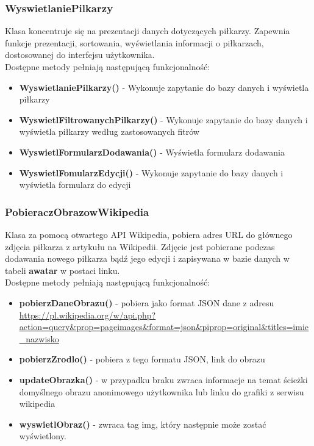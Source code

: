     \subsubsection{WyswietlaniePilkarzy}
        Klasa koncentruje się na prezentacji danych dotyczących piłkarzy. Zapewnia funkcje prezentacji, sortowania, wyświetlania informacji o piłkarzach, dostosowanej do interfejsu użytkownika.\\
        Dostępne metody pełniają następującą funkcjonalność: 
        \begin{itemize}
            \item \textbf{WyswietlaniePilkarzy()} -  Wykonuje zapytanie do bazy danych i wyświetla piłkarzy
            \item \textbf{WyswietlFiltrowanychPilkarzy()} - Wykonuje zapytanie do bazy danych i wyświetla piłkarzy według zastosowanych fitrów
            \item \textbf{WyswietlFormularzDodawania()} - Wyświetla formularz dodawania 
            \item \textbf{WyswietlFomularzEdycji()} - Wykonuje zapytanie do bazy danych i wyświetla formularz do edycji
        \end{itemize}
         



    \subsubsection{PobieraczObrazowWikipedia}
        Klasa za pomocą otwartego API Wikipedia, pobiera adres URL do głównego zdjęcia piłkarza z artykułu na Wikipedii. Zdjęcie jest pobierane podczas dodawania nowego piłkarza bądź jego edycji i zapisywana w bazie danych w tabeli \textbf{awatar} w postaci linku.\\
        Dostępne metody pełniają następującą funkcjonalność: 
        \begin{itemize}
            \item \textbf{pobierzDaneObrazu()} -  pobiera jako format JSON dane z adresu \url{https://pl.wikipedia.org/w/api.php?action=query&prop=pageimages&format=json&piprop=original&titles=imie_nazwisko}
            \item \textbf{pobierzZrodlo()} - pobiera z tego formatu JSON, link do obrazu
            \item \textbf{updateObrazka()} - w przypadku braku zwraca informacje na temat ścieżki domyślnego obrazu anonimowego użytkownika lub linku do grafiki z serwisu wikipedia
            \item \textbf{wyswietlObraz()} - zwraca tag img, który następnie może zostać wyświetlony.
        \end{itemize}
         


